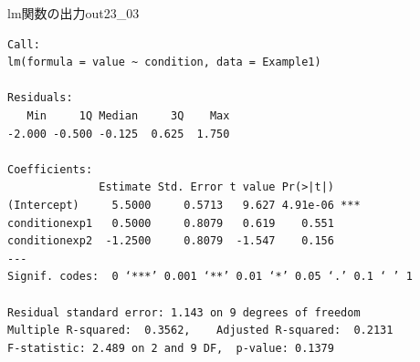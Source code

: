 \begin{Rscreen}{lm関数の出力}{out23_03}
	\begin{verbatim}
Call:
lm(formula = value ~ condition, data = Example1)

Residuals:
   Min     1Q Median     3Q    Max 
-2.000 -0.500 -0.125  0.625  1.750 

Coefficients:
              Estimate Std. Error t value Pr(>|t|)    
(Intercept)     5.5000     0.5713   9.627 4.91e-06 ***
conditionexp1   0.5000     0.8079   0.619    0.551    
conditionexp2  -1.2500     0.8079  -1.547    0.156    
---
Signif. codes:  0 ‘***’ 0.001 ‘**’ 0.01 ‘*’ 0.05 ‘.’ 0.1 ‘ ’ 1

Residual standard error: 1.143 on 9 degrees of freedom
Multiple R-squared:  0.3562,	Adjusted R-squared:  0.2131 
F-statistic: 2.489 on 2 and 9 DF,  p-value: 0.1379
\end{verbatim}
\end{Rscreen}
